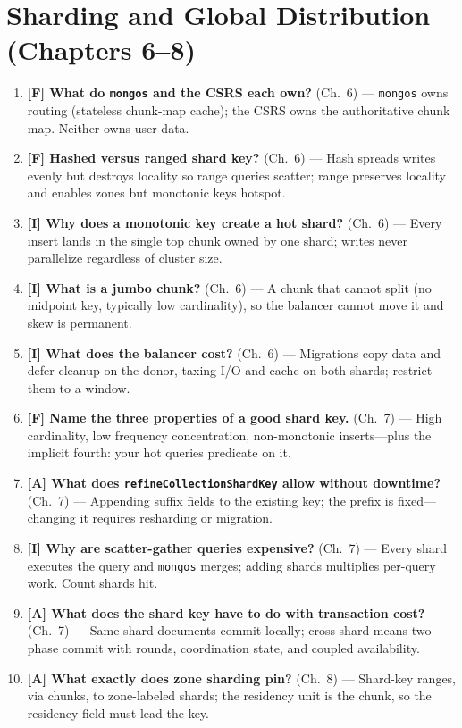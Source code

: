 \section{Sharding and Global Distribution (Chapters 6--8)}
\begin{enumerate}
    \item \textbf{[F] What do \texttt{mongos} and the CSRS each own?} (Ch.~6) --- \texttt{mongos} owns routing (stateless chunk-map cache); the CSRS owns the authoritative chunk map. Neither owns user data.
    \item \textbf{[F] Hashed versus ranged shard key?} (Ch.~6) --- Hash spreads writes evenly but destroys locality so range queries scatter; range preserves locality and enables zones but monotonic keys hotspot.
    \item \textbf{[I] Why does a monotonic key create a hot shard?} (Ch.~6) --- Every insert lands in the single top chunk owned by one shard; writes never parallelize regardless of cluster size.
    \item \textbf{[I] What is a jumbo chunk?} (Ch.~6) --- A chunk that cannot split (no midpoint key, typically low cardinality), so the balancer cannot move it and skew is permanent.
    \item \textbf{[I] What does the balancer cost?} (Ch.~6) --- Migrations copy data and defer cleanup on the donor, taxing I/O and cache on both shards; restrict them to a window.
    \item \textbf{[F] Name the three properties of a good shard key.} (Ch.~7) --- High cardinality, low frequency concentration, non-monotonic inserts---plus the implicit fourth: your hot queries predicate on it.
    \item \textbf{[A] What does \texttt{refineCollectionShardKey} allow without downtime?} (Ch.~7) --- Appending suffix fields to the existing key; the prefix is fixed---changing it requires resharding or migration.
    \item \textbf{[I] Why are scatter-gather queries expensive?} (Ch.~7) --- Every shard executes the query and \texttt{mongos} merges; adding shards multiplies per-query work. Count shards hit.
    \item \textbf{[A] What does the shard key have to do with transaction cost?} (Ch.~7) --- Same-shard documents commit locally; cross-shard means two-phase commit with rounds, coordination state, and coupled availability.
    \item \textbf{[A] What exactly does zone sharding pin?} (Ch.~8) --- Shard-key ranges, via chunks, to zone-labeled shards; the residency unit is the chunk, so the residency field must lead the key.

\end{enumerate}
